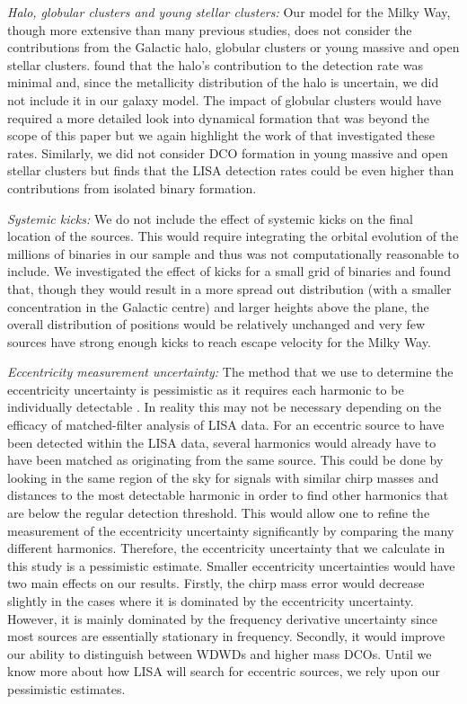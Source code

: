 \textit{Halo, globular clusters and young stellar clusters:} Our model for the Milky Way, though more extensive than many previous studies, does not consider the contributions from the Galactic halo, globular clusters or young massive and open stellar clusters. \citet{Lamberts+2018} found that the halo's contribution to the detection rate was minimal and, since the metallicity distribution of the halo is uncertain, we did not include it in our galaxy model. The impact of globular clusters would have required a more detailed look into dynamical formation that was beyond the scope of this paper but we again highlight the work of \citet{Kremer+2018} that investigated these rates. Similarly, we did not consider DCO formation in young massive and open stellar clusters but \citet{Banerjee+2020} finds that the LISA detection rates could be even higher than contributions from isolated binary formation.

\textit{Systemic kicks:} We do not include the effect of systemic kicks on the final location of the sources. This would require integrating the orbital evolution of the millions of binaries in our sample and thus was not computationally reasonable to include. We investigated the effect of kicks for a small grid of binaries and found that, though they would result in a more spread out distribution (with a smaller concentration in the Galactic centre) and larger heights above the plane, the overall distribution of positions would be relatively unchanged and very few sources have strong enough kicks to reach escape velocity for the Milky Way.

\textit{Eccentricity measurement uncertainty:} The method that we use to determine the eccentricity uncertainty is pessimistic as it requires each harmonic to be individually detectable \citep[e.g.][]{Lau+2020}. In reality this may not be necessary depending on the efficacy of matched-filter analysis of LISA data. For an eccentric source to have been detected within the LISA data, several harmonics would already have to have been matched as originating from the same source. This could be done by looking in the same region of the sky for signals with similar chirp masses and distances to the most detectable harmonic in order to find other harmonics that are below the regular detection threshold. This would allow one to refine the measurement of the eccentricity uncertainty significantly by comparing the many different harmonics. Therefore, the eccentricity uncertainty that we calculate in this study is a pessimistic estimate. Smaller eccentricity uncertainties would have two main effects on our results. Firstly, the chirp mass error would decrease slightly in the cases where it is dominated by the eccentricity uncertainty. However, it is mainly dominated by the frequency derivative uncertainty since most sources are essentially stationary in frequency. Secondly, it would improve our ability to distinguish between WDWDs and higher mass DCOs. Until we know more about how LISA will search for eccentric sources, we rely upon our pessimistic estimates.
